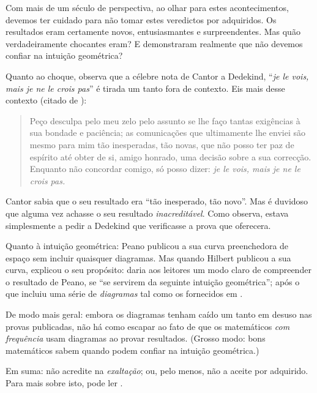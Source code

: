 \documentclass[../../../include/open-logic-section]{subfiles}
\begin{document}


Com mais de um século de perspectiva, ao olhar para estes acontecimentos,
devemos ter cuidado para não tomar estes veredictos por adquiridos. Os resultados eram
certamente novos, entusiasmantes e surpreendentes. Mas quão verdadeiramente chocantes eram?
E demonstraram realmente que não devemos confiar na
intuição geométrica?

Quanto ao choque, \citet{Gouvea2011} observa que a célebre nota de Cantor a Dedekind,
``\emph{je le vois, mais je ne le crois
pas}'' é tirada um tanto fora de contexto. Eis mais desse contexto
(citado de \citeauthor{Gouvea2011}):
\begin{quote}
Peço desculpa pelo meu zelo pelo assunto se lhe faço tantas exigências à
sua bondade e paciência; as comunicações que ultimamente lhe enviei
são mesmo para mim tão inesperadas, tão novas, que não posso ter paz de espírito
até obter de si, amigo honrado, uma decisão sobre a sua
correcção. Enquanto não concordar comigo, só posso dizer:
\emph{je le vois, mais je ne le crois pas.} 
\end{quote}
Cantor sabia que o seu resultado era ``tão inesperado, tão novo''. Mas é
duvidoso que alguma vez achasse o seu resultado \emph{inacreditável}. Como
\citeauthor{Gouvea2011} observa, estava simplesmente a pedir a Dedekind que
verificasse a prova que oferecera. 

\enlargethispage{2\baselineskip}%
Quanto à intuição geométrica: Peano publicou a sua
curva preenchedora de espaço sem incluir quaisquer diagramas. Mas quando Hilbert
publicou a sua curva, explicou o seu propósito: daria aos
leitores um modo claro de compreender o resultado de Peano, se ``se
servirem da seguinte intuição geométrica''; após o que
incluiu uma série de \emph{diagramas} tal como os fornecidos em
. 

De modo mais geral: embora os diagramas tenham caído um tanto em desuso nas
provas publicadas, não há como escapar ao fato de que os
matemáticos \emph{com frequência} usam diagramas ao provar resultados.
(Grosso modo: bons matemáticos sabem quando podem confiar na
intuição geométrica.)

Em suma: não acredite na \emph{exaltação}; ou, pelo menos, não a aceite por adquirido. Para mais sobre isto, pode ler \citet{Giaquinto2007}.
\end{document}
